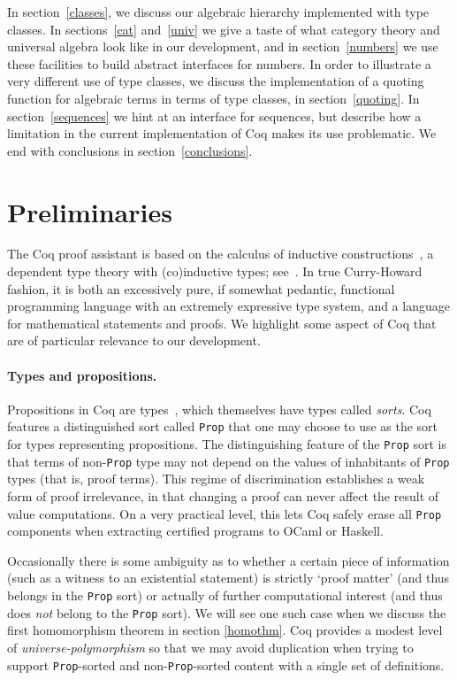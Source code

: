 \documentclass[a4paper,10pt,runningheads]{llncs}
\begin{document}
 In section~\ref{classes}, we discuss our algebraic hierarchy implemented with type classes. In sections~\ref{cat} and~\ref{univ} we give a taste of what category theory and universal algebra look like in our development, and in section~\ref{numbers} we use these facilities to build abstract interfaces for numbers. In order to illustrate a very different use of type classes, we discuss the implementation of a quoting function for algebraic terms in terms of type classes, in section~\ref{quoting}. In section~\ref{sequences} we hint at an interface for sequences, but describe how a limitation in the current implementation of Coq makes its use problematic. We end with conclusions in section~\ref{conclusions}.


\section{Preliminaries}
\label{preliminaries}

The Coq proof assistant is based on the calculus of inductive
constructions~\cite{CoquandHuet,CoquandPaulin}, a dependent type theory with (co)inductive types; see~\cite{BC04,Coq}. In true Curry-Howard fashion, it is both an excessively pure, if somewhat pedantic, functional programming language with an extremely expressive type system, and a language for mathematical statements and proofs. We highlight some aspect of Coq that are of particular relevance to our development.

\paragraph{Types and propositions.}

Propositions in Coq are types~\cite{CMCP,ITT}, which themselves have types called \emph{sorts}. Coq features a distinguished sort called \lstinline|Prop| that one may choose to use as the sort for types representing propositions. The distinguishing feature of the \lstinline|Prop| sort is that terms of non-\lstinline|Prop| type may not depend on the values of inhabitants of \lstinline|Prop| types (that is, proof terms).
This regime of discrimination establishes a weak form of proof irrelevance, in that changing a proof can never affect the result of value computations. On a very practical level, this lets Coq safely erase all \lstinline|Prop| components when extracting certified programs to OCaml or Haskell.

Occasionally there is some ambiguity as to whether a certain piece of information (such as a witness to an existential statement) is strictly `proof matter' (and thus belongs in the \lstinline|Prop| sort) or actually of further computational interest (and thus does \emph{not} belong to the \lstinline|Prop| sort). We will see one such case when we discuss the first homomorphism theorem in section \ref{homothm}. Coq provides a modest level of \emph{universe-polymorphism} so that we may avoid duplication when trying to support \lstinline|Prop|-sorted and non-\lstinline|Prop|-sorted content with a single set of definitions.
\end{document}
